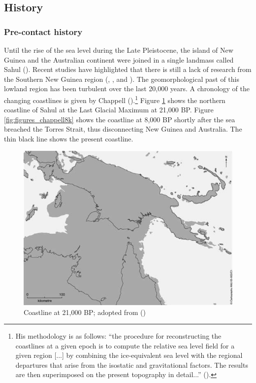 \subsection{History}\label{history}

\subsubsection{Pre-contact history}\label{prehistory}

Until the rise of the sea level during the Late Pleistocene, the island of New Guinea and the Australian continent were joined in a single landmass called Sahul (\citealt{White:1982prehist}). Recent studies have highlighted that there is still a lack of research from the Southern New Guinea region (\citealt{Pawley:2005ue}, \citealt{Ballard:2010cd}, and \citealt{Evans:2012wp}). The geomorphological past of this lowland region has been turbulent over the last 20,000 years. A chronology of the changing coastlines is given by Chappell (\citeyear{Chappell:2005coastal}).\footnote{His methodology is as follows: ``the procedure for reconstructing the coastlines at a given epoch is to compute the relative sea level field for a given region [...] by combining the ice-equivalent sea level with the regional departures that arise from the isostatic and gravitational factors. The results are then superimposed on the present topography in detail...'' (\citeyear[529]{Chappell:2005coastal}).} Figure \ref{fig:figures_chappell21k} shows the northern coastline of Sahul at the Last Glacial Maximum at 21,000 BP. Figure \ref{fig:figures_chappell8k} shows the coastline at 8,000 BP shortly after the sea breached the Torres Strait, thus disconnecting New Guinea and Australia. The thin black line shows the present coastline.

\begin{figure}
    \includegraphics[width=.6\textwidth]{figures/chappell21k.png}
  \caption[Coastline at 21,000 BP]{Coastline at 21,000 BP; adopted from (\citealt[527]{Chappell:2005coastal})}
  \label{fig:figures_chappell21k}
\end{figure}%

